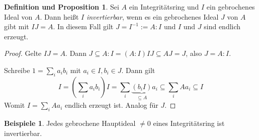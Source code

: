 \documentclass[
twoside=semi,
fontsize=12,
DIV=12, 
cleardoublepage=current,
leqno,
headings=optiontoheadandtoc, 
toc=idx
]{scrbook}
\theoremstyle{definition}
\newtheorem{beispiele}[definition]{Beispiele}
\newtheorem{def-prop}[definition]{Definition und Proposition}
\begin{document}
 	\begin{def-prop}\label{2.2.9}
 		Sei $A$ ein Integrit\"atsring und $I$ ein gebrochenes Ideal von $A$. Dann hei\ss t $I$ \emph{invertierbar}, wenn es ein gebrochenes Ideal $J$ von $A$ gibt mit $IJ = A$. In diesem Fall gilt $J=I^{-1}:=A:I$ und $I$ und $J$ sind endlich erzeugt.
 		
 		\begin{proof}
 			Gelte $IJ = A$. Dann $J \subseteq A:I = (A:I)IJ \subseteq AJ = J$, also $J = A:I$. 
 			
 			Schreibe $1 = \sum_i a_ib_i$ mit $a_i \in I, b_i \in J$. Dann gilt 
 			\[I = (\sum_i a_ib_i)I = \sum_i\underbrace{(b_iI)}_{\subseteq A}a_i \subseteq \sum_i Aa_i \subseteq I\]
 			Womit $I = \sum_i Aa_i$ endlich erzeugt ist. Analog f\"ur $J$.
 		\end{proof}
 	\end{def-prop}
 
 	\begin{beispiele}\label{2.2.10}
 		Jedes gebrochene Hauptideal $\neq 0$ eines Integrit\"atsring ist invertierbar.
 	\end{beispiele}
 
\end{document}
